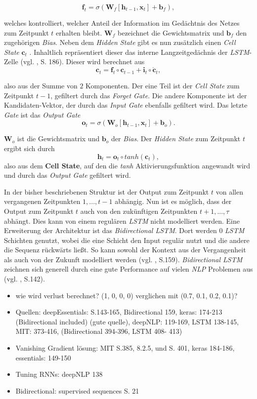 \documentclass[a4paper,11pt]{article}
\begin{document}
\[  \bm{f}_t = \sigma(\bm{W}_f [\bm{h}_{t-1}, \bm{x}_t] + \bm{b}_f) ,\]

welches kontrolliert, welcher Anteil der Information im Gedächtnis des Netzes zum Zeitpunkt $t$ erhalten bleibt. $\bm{W}_f$ bezeichnet die Gewichtsmatrix und $\bm{b}_f$ den zugehörigen \textit{Bias}. Neben dem \textit{Hidden State} gibt es nun zusätzlich einen \textit{Cell State} $\bm{c}_t$ . Inhaltlich repräsentiert dieser das interne Langzeitgedächnis der \textit{LSTM}-Zelle (vgl. \cite{keras}, S. 186). Dieser wird berechnet aus
\[\bm{c}_t = \bm{f}_t \circ \bm{c}_{t-1} + \bm{i}_t \circ \bm{\acute{c}}_t ,\]

also aus der Summe von $2$ Komponenten. Der eine Teil ist der \textit{Cell State} zum Zeitpunkt $t-1$, gefiltert durch das \textit{Forget Gate}. Die andere Komponente ist der Kandidaten-Vektor, der durch das \textit{Input Gate} ebenfalls gefiltert wird.
Das letzte \textit{Gate} ist das \textit{Output Gate} 
\[  \bm{o}_t = \sigma(\bm{W}_o [\bm{h}_{t-1}, \bm{x}_t] + \bm{b}_o).\]

$\bm{W}_o$ ist die Gewichtsmatrix und $\bm{b}_o$ der \textit{Bias}. Der \textit{Hidden State} zum Zeitpunkt $t$ ergibt sich durch
\[\bm{h}_t = \bm{o}_t \circ tanh(\bm{c}_t) , \]
also aus dem \textbf{Cell State}, auf den die \textit{tanh} Aktivierungsfunktion angewandt wird und durch das \textit{Output Gate} gefiltert wird.  

In der bisher beschriebenen Struktur ist der Output zum Zeitpunkt $t$ von allen vergangenen Zeitpunkten $1,...,t-1$ abhängig. Nun ist es möglich, dass der Output zum Zeitpunkt $t$ auch von den zukünftigen Zeitpunkten $t+1,..., \tau$ abhängt. Dies kann von einem regulären \textit{LSTM} nicht modelliert werden. Eine Erweiterung der Architektur ist das \textit{Bidirectional LSTM}. Dort werden $0$ \textit{LSTM} Schichten genutzt, wobei die eine Schicht den Input regulär nutzt und die andere die Sequenz rückwärts ließt. So kann sowohl der Kontext aus der Vergangenheit als auch von der Zukunft modelliert werden (vgl. \cite{deepEssentials}, S.159).
\textit{Bidirectional LSTM} zeichnen sich generell durch eine gute Performance auf vielen \textit{NLP} Problemen aus (vgl. \cite{deepNLP}, S.142).



\begin{itemize}
\item wie wird verlust berechnet? (1, 0, 0, 0) verglichen mit (0.7, 0.1, 0.2, 0.1)?
    \item Quellen: deepEssentials: S.143-165, Bidirectional 159,  keras: 174-213 (Bidirectional included) (gute quelle),  deepNLP: 119-169, LSTM 138-145, MIT: 373-416, (Bidirectional 394-396, LSTM 408- 413)
    \item Vanishing Gradient lösung: MIT S.385, 8.2.5, und S. 401, keras 184-186, essentials: 149-150
    \item Tuning RNNs: deepNLP 138
    \item Bidirectional: supervised sequences S. 21
\end{itemize}{}


\newpage
\end{document}
